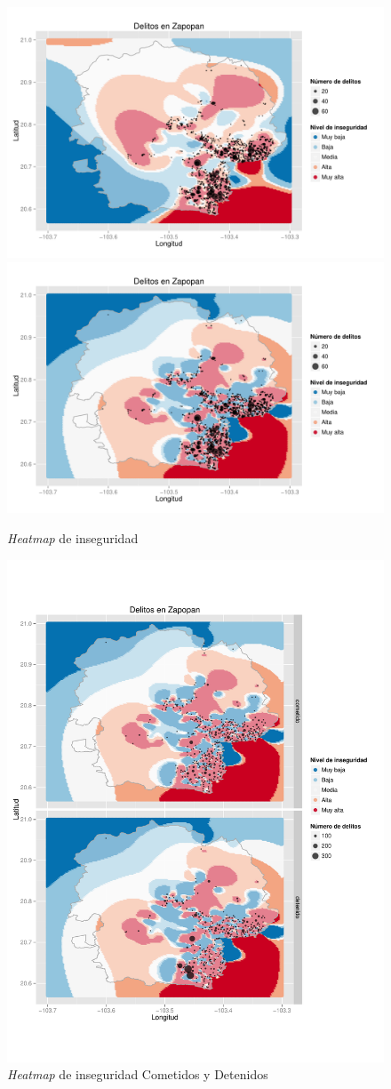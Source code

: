 \begin{figure}[H]
\centering
\caption{\textit{Heatmap} de inseguridad}
\includegraphics[width=120mm]{../../graphs/heat_y_delitos.pdf}
\includegraphics[width=120mm]{../../graphs/heat_y_delitos2.pdf}
\end{figure}

\begin{figure}[H]
\centering
\caption{\textit{Heatmap} de inseguridad Cometidos y Detenidos}

\includegraphics[width=120mm]{../../graphs/heat_facet.pdf}
\end{figure}

